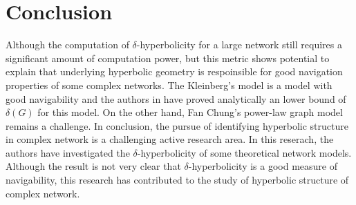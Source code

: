 \documentclass[a4paper,12pt]{article}
\begin{document}
\section{Conclusion}
Although the computation of $\delta$-hyperbolicity for a large network still requires a significant amount of computation power, but this metric shows potential to explain that underlying hyperbolic geometry is respoinsible for good navigation properties of some complex networks. The Kleinberg's model is a model with good navigability and the authors in \cite{1} have proved analytically an lower bound of $\delta(G)$ for this model. On the other hand, Fan Chung's power-law graph model
remains a challenge. In conclusion, the pursue of identifying hyperbolic structure in complex network is a challenging active research area. In this reserach, the authors have investigated the $\delta$-hyperbolicity of some theoretical network models. Although the result is not very clear that $\delta$-hyperbolicity is a good measure of navigability, this research has contributed to the study of hyperbolic structure of complex network.

\end{document}
